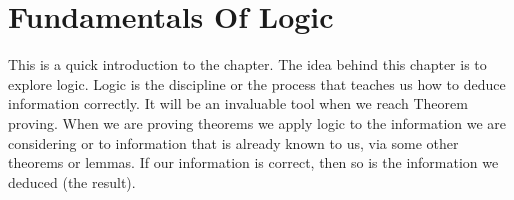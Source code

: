 
\part{Fundamentals Of Logic}

This is a quick introduction to the chapter. The idea behind this chapter is to explore logic. Logic is the discipline or the process that teaches us how to deduce information correctly. It will be an invaluable tool when we reach Theorem proving. When we are proving theorems we apply logic to the information we are considering or to information that is already known to us, via some other theorems or lemmas. If our information is correct, then so is the information we deduced (the result). \newpage














